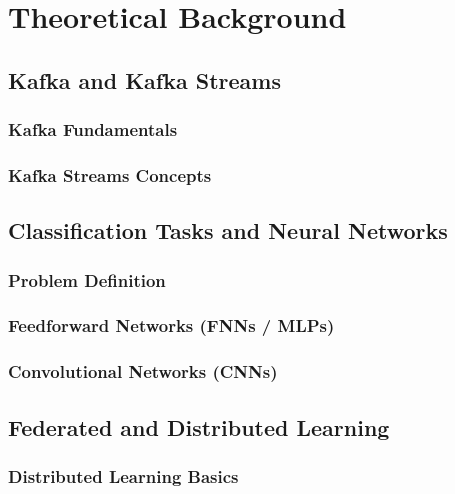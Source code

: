 \chapter{Theoretical Background}


\section{Kafka and Kafka Streams}
\subsection{Kafka Fundamentals}

\subsection{Kafka Streams Concepts}

\section{Classification Tasks and Neural Networks}
\subsection{Problem Definition}

\subsection{Feedforward Networks (FNNs / MLPs)}

\subsection{Convolutional Networks (CNNs)}

\section{Federated and Distributed Learning}
\subsection{Distributed Learning Basics}


